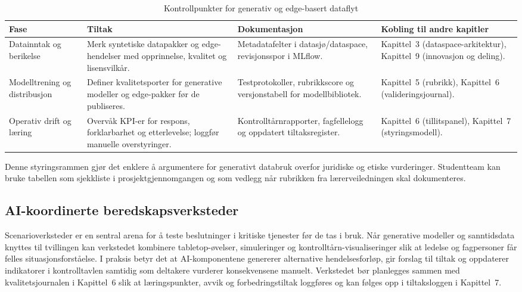 \begin{table}[htbp]
    \centering
    \caption{Kontrollpunkter for generativ og edge-basert dataflyt}
    \label{tab:kontrollpunkter-generativ}
    \begin{tabular}{p{3.6cm}p{4.0cm}p{4.2cm}p{3.8cm}}
        \toprule
        \textbf{Fase} & \textbf{Tiltak} & \textbf{Dokumentasjon} & \textbf{Kobling til andre kapitler} \\
        \midrule
        Datainntak og berikelse & Merk syntetiske datapakker og edge-hendelser med opprinnelse, kvalitet og lisensvilkår. & Metadatafelter i datasjø/dataspace, revisjonsspor i MLflow. & Kapittel~3 (dataspace-arkitektur), Kapittel~9 (innovasjon og deling). \\
        \addlinespace
        Modelltrening og distribusjon & Definer kvalitetsporter for generative modeller og edge-pakker før de publiseres. & Testprotokoller, rubrikkscore og versjonstabell for modellbibliotek. & Kapittel~5 (rubrikk), Kapittel~6 (valideringsjournal). \\
        \addlinespace
        Operativ drift og læring & Overvåk KPI-er for respons, forklarbarhet og etterlevelse; loggfør manuelle overstyringer. & Kontrolltårnrapporter, fagfellelogg og oppdatert tiltaksregister. & Kapittel~6 (tillitspanel), Kapittel~7 (styringsmodell). \\
        \bottomrule
    \end{tabular}
\end{table}

Denne styringsrammen gjør det enklere å argumentere for generativt databruk overfor juridiske og etiske vurderinger. Studentteam kan bruke tabellen som sjekkliste i prosjektgjennomgangen og som vedlegg når rubrikken fra lærerveiledningen skal dokumenteres.

\subsection{AI-koordinerte beredskapsverksteder}
Scenarioverksteder er en sentral arena for å teste beslutninger i kritiske tjenester før de tas i bruk. Når generative modeller og sanntidsdata knyttes til tvillingen kan verkstedet kombinere tabletop-øvelser, simuleringer og kontrolltårn-visualiseringer slik at ledelse og fagpersoner får felles situasjonsforståelse.\citep{dsb2024nser,statnett2024kontrolltarn} I praksis betyr det at AI-komponentene genererer alternative hendelsesforløp, gir forslag til tiltak og oppdaterer indikatorer i kontrolltavlen samtidig som deltakere vurderer konsekvensene manuelt. Verkstedet bør planlegges sammen med kvalitetsjournalen i Kapittel~6 slik at læringspunkter, avvik og forbedringstiltak loggføres og kan følges opp i tiltaksloggen i Kapittel~7.\citep{dnv2023digitalassurance}

